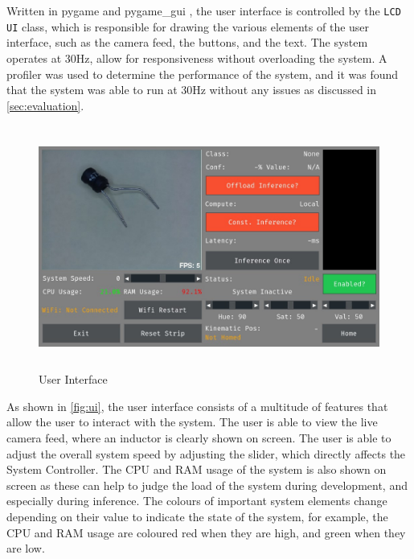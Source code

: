 Written in pygame \cite{pygamedoc} and pygame\_gui \cite{pygamegui}, the user interface is controlled by the \texttt{LCD UI} class, which is responsible for drawing the various elements of the user interface, such as the camera feed, the buttons, and the text. The system operates at 30Hz, allow for responsiveness without overloading the system. A profiler was used to determine the performance of the system, and it was found that the system was able to run at 30Hz without any issues as discussed in \autoref{sec:evaluation}.


\begin{figure}[H]
    \hfill
    \begin{minipage}[t]{\textwidth}
      \centering
      \includegraphics[height=8cm]{imgs/software/screenresistor.jpg}
      \caption{User Interface}
      \label{fig:ui}
    \end{minipage}
\end{figure}

As shown in \autoref{fig:ui}, the user interface consists of a multitude of features that allow the user to interact with the system. The user is able to view the live camera feed, where an inductor is clearly shown on screen. The user is able to adjust the overall system speed by adjusting the slider, which directly affects the System Controller. The CPU and RAM usage of the system is also shown on screen as these can help to judge the load of the system during development, and especially during inference. The colours of important system elements change depending on their value to indicate the state of the system, for example, the CPU and RAM usage are coloured red when they are high, and green when they are low. 

